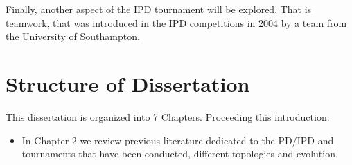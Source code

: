 Finally, another aspect of the IPD tournament will be explored. That is teamwork, that
was introduced in the IPD competitions in 2004 by a team from the University of Southampton.

\section{Structure of Dissertation}
This dissertation is organized into 7 Chapters. Proceeding this introduction:
\begin{itemize}
  \item In Chapter 2 we review previous literature dedicated to the PD/IPD
        and tournaments that have been conducted, different topologies and evolution.
\end{itemize}
